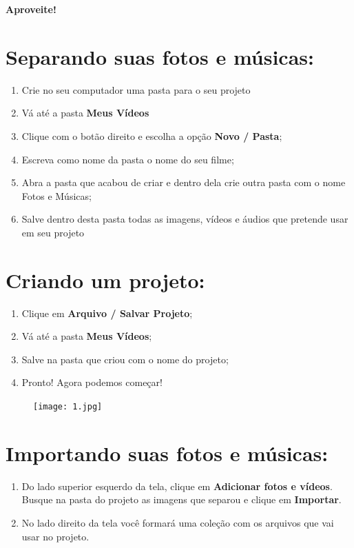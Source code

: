 \documentclass{article}
\begin{document}
{\textbf{Aproveite!}

\newpage

\section{Separando suas fotos e músicas:}
\begin{enumerate}
\item Crie no seu computador uma pasta para o seu projeto
\item Vá até a pasta \textbf{Meus Vídeos}
\item Clique com o botão direito e escolha a opção \textbf{Novo / Pasta};
\item Escreva como nome da pasta o nome do seu filme;
\item Abra a pasta que acabou de criar e dentro dela crie outra pasta com o nome Fotos e Músicas;
\item Salve dentro desta pasta todas as imagens, vídeos e áudios que pretende usar em seu projeto
\end{enumerate}

\section{Criando um projeto:}
\begin{enumerate}
\item Clique em \textbf{Arquivo / Salvar Projeto};
\item Vá até a pasta \textbf{Meus Vídeos};
\item Salve na pasta que criou com o nome do projeto;
\item Pronto! Agora podemos começar!
\end{enumerate}

\begin{figure}[h!]
\centering
\texttt{[image: 1.jpg]}
\end{figure}

\newpage

\section{Importando suas fotos e músicas:}
\begin{enumerate}
\item Do lado superior esquerdo da tela, clique em \textbf{Adicionar fotos e vídeos}. Busque na pasta do projeto as imagens que separou e clique em \textbf{Importar}.
\item No lado direito da tela você formará uma coleção com os arquivos que vai usar no projeto.
\end{enumerate}

}
\end{document}
